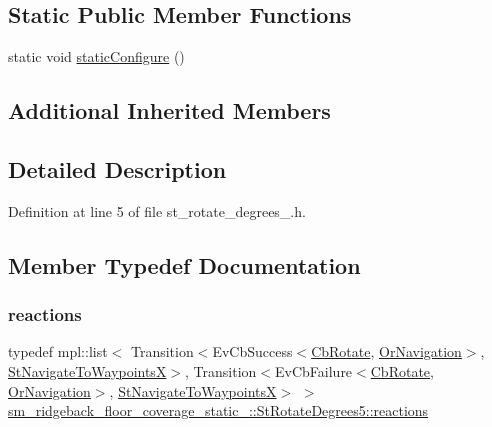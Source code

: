 \subsection*{Static Public Member Functions}
\begin{DoxyCompactItemize}
\item 
static void \hyperlink{structsm__ridgeback__floor__coverage__static__1_1_1StRotateDegrees5_ae37fffe9d89ddc649f626cb6bdf034ee}{static\+Configure} ()
\end{DoxyCompactItemize}
\subsection*{Additional Inherited Members}


\subsection{Detailed Description}


Definition at line 5 of file st\+\_\+rotate\+\_\+degrees\+\_.\+h.



\subsection{Member Typedef Documentation}
\mbox{\label{structsm__ridgeback__floor__coverage__static__1_1_1StRotateDegrees5_a8ca46411a40b4877268cca9c99b0703e}} 
\subsubsection{\texorpdfstring{reactions}{reactions}}
{\footnotesize\ttfamily typedef mpl\+::list$<$ Transition$<$Ev\+Cb\+Success$<$\hyperlink{classcl__move__base__z_1_1CbRotate}{Cb\+Rotate}, \hyperlink{classsm__ridgeback__floor__coverage__static__1_1_1OrNavigation}{Or\+Navigation}$>$, \hyperlink{structsm__ridgeback__floor__coverage__static__1_1_1StNavigateToWaypointsX}{St\+Navigate\+To\+WaypointsX}$>$, Transition$<$Ev\+Cb\+Failure$<$\hyperlink{classcl__move__base__z_1_1CbRotate}{Cb\+Rotate}, \hyperlink{classsm__ridgeback__floor__coverage__static__1_1_1OrNavigation}{Or\+Navigation}$>$, \hyperlink{structsm__ridgeback__floor__coverage__static__1_1_1StNavigateToWaypointsX}{St\+Navigate\+To\+WaypointsX}$>$ $>$ \hyperlink{structsm__ridgeback__floor__coverage__static__1_1_1StRotateDegrees5_a8ca46411a40b4877268cca9c99b0703e}{sm\+\_\+ridgeback\+\_\+floor\+\_\+coverage\+\_\+static\+\_\+::\+St\+Rotate\+Degrees5\+::reactions}}



